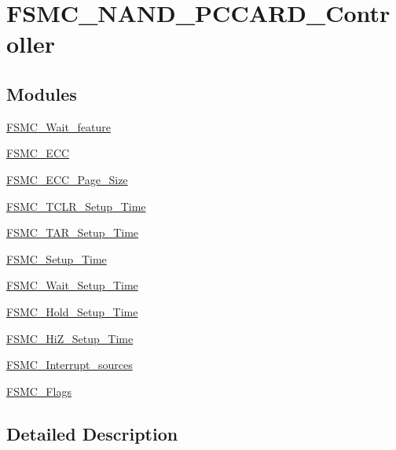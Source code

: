 \hypertarget{group___f_s_m_c___n_a_n_d___p_c_c_a_r_d___controller}{\section{F\-S\-M\-C\-\_\-\-N\-A\-N\-D\-\_\-\-P\-C\-C\-A\-R\-D\-\_\-\-Controller}
\label{group___f_s_m_c___n_a_n_d___p_c_c_a_r_d___controller}
}
\subsection*{Modules}
\begin{DoxyCompactItemize}
\item 
\hyperlink{group___f_s_m_c___wait__feature}{F\-S\-M\-C\-\_\-\-Wait\-\_\-feature}
\item 
\hyperlink{group___f_s_m_c___e_c_c}{F\-S\-M\-C\-\_\-\-E\-C\-C}
\item 
\hyperlink{group___f_s_m_c___e_c_c___page___size}{F\-S\-M\-C\-\_\-\-E\-C\-C\-\_\-\-Page\-\_\-\-Size}
\item 
\hyperlink{group___f_s_m_c___t_c_l_r___setup___time}{F\-S\-M\-C\-\_\-\-T\-C\-L\-R\-\_\-\-Setup\-\_\-\-Time}
\item 
\hyperlink{group___f_s_m_c___t_a_r___setup___time}{F\-S\-M\-C\-\_\-\-T\-A\-R\-\_\-\-Setup\-\_\-\-Time}
\item 
\hyperlink{group___f_s_m_c___setup___time}{F\-S\-M\-C\-\_\-\-Setup\-\_\-\-Time}
\item 
\hyperlink{group___f_s_m_c___wait___setup___time}{F\-S\-M\-C\-\_\-\-Wait\-\_\-\-Setup\-\_\-\-Time}
\item 
\hyperlink{group___f_s_m_c___hold___setup___time}{F\-S\-M\-C\-\_\-\-Hold\-\_\-\-Setup\-\_\-\-Time}
\item 
\hyperlink{group___f_s_m_c___hi_z___setup___time}{F\-S\-M\-C\-\_\-\-Hi\-Z\-\_\-\-Setup\-\_\-\-Time}
\item 
\hyperlink{group___f_s_m_c___interrupt__sources}{F\-S\-M\-C\-\_\-\-Interrupt\-\_\-sources}
\item 
\hyperlink{group___f_s_m_c___flags}{F\-S\-M\-C\-\_\-\-Flags}
\end{DoxyCompactItemize}


\subsection{Detailed Description}
